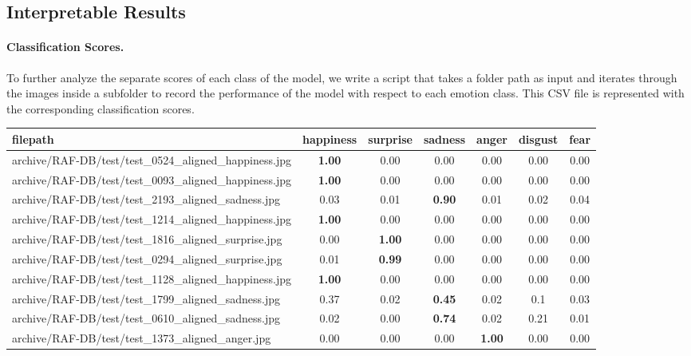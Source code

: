 \subsection{Interpretable Results}
\label{sec:evaluation:inter}

\paragraph{Classification Scores.}
To further analyze the separate scores of each class of the model, 
we write a script that takes a folder path as input and iterates through the images inside a subfolder to record the performance of the model with respect to each emotion class. 
This CSV file is represented with the corresponding classification scores. 

\begin{table}[ht]
  \centering
  \begin{tabular}{@{}lcccccc@{}}
  \toprule
  filepath & happiness & surprise & sadness & anger & disgust & fear \\
  \midrule
  archive/RAF-DB/test/test\_0524\_aligned\_happiness.jpg & \textbf{1.00} & 0.00 & 0.00 & 0.00 & 0.00 & 0.00 \\
  archive/RAF-DB/test/test\_0093\_aligned\_happiness.jpg & \textbf{1.00} & 0.00 & 0.00 & 0.00 & 0.00 & 0.00 \\
  archive/RAF-DB/test/test\_2193\_aligned\_sadness.jpg & 0.03 & 0.01 & \textbf{0.90} & 0.01 & 0.02 & 0.04 \\
  archive/RAF-DB/test/test\_1214\_aligned\_happiness.jpg & \textbf{1.00} & 0.00 & 0.00 & 0.00 & 0.00 & 0.00 \\
  archive/RAF-DB/test/test\_1816\_aligned\_surprise.jpg & 0.00 & \textbf{1.00} & 0.00 & 0.00 & 0.00 & 0.00 \\
  archive/RAF-DB/test/test\_0294\_aligned\_surprise.jpg & 0.01 & \textbf{0.99} & 0.00 & 0.00 & 0.00 & 0.00 \\
  archive/RAF-DB/test/test\_1128\_aligned\_happiness.jpg & \textbf{1.00} & 0.00 & 0.00 & 0.00 & 0.00 & 0.00 \\
  archive/RAF-DB/test/test\_1799\_aligned\_sadness.jpg & 0.37 & 0.02 & \textbf{0.45} & 0.02 & 0.1 & 0.03 \\
  archive/RAF-DB/test/test\_0610\_aligned\_sadness.jpg & 0.02 & 0.00 & \textbf{0.74} & 0.02 & 0.21 & 0.01 \\
  archive/RAF-DB/test/test\_1373\_aligned\_anger.jpg & 0.00 & 0.00 & 0.00 & \textbf{1.00} & 0.00 & 0.00 \\

\end{tabular}
\end{table}
